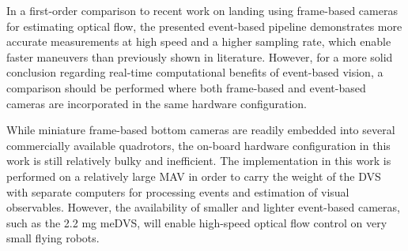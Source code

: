 In a first-order comparison to recent work on landing using frame-based cameras for estimating optical flow, the presented event-based pipeline demonstrates more accurate measurements at high speed and a higher sampling rate, which enable faster maneuvers than previously shown in literature. However, for a more solid conclusion regarding real-time computational benefits of event-based vision, a comparison should be performed where both frame-based and event-based cameras are incorporated in the same hardware configuration. 

While miniature frame-based bottom cameras are readily embedded into several commercially available quadrotors, the on-board hardware configuration in this work is still relatively bulky and inefficient. The implementation in this work is performed on a relatively large MAV in order to carry the weight of the DVS with separate computers for processing events and estimation of visual observables. However, the availability of smaller and lighter event-based cameras, such as the 2.2 mg meDVS, will enable high-speed optical flow control on very small flying robots. %


%
%
%
